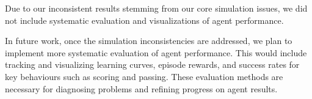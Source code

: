 Due to our inconsistent results stemming from our core simulation issues, we did not include systematic evaluation and visualizations of agent performance.

In future work, once the simulation inconsistencies are addressed, we plan to implement more systematic evaluation of agent performance. This would include tracking and visualizing learning curves, episode rewards, and success rates for key behaviours such as scoring and passing. These evaluation methods are necessary for diagnosing problems and refining progress on agent results.

